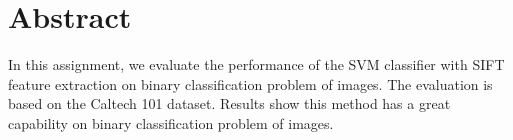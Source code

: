 \section{Abstract}
In this assignment, 
we evaluate the performance of the SVM classifier with SIFT feature extraction on binary classification problem of images. 
The evaluation is based on the Caltech 101 dataset. 
Results show this method has a great capability on binary classification problem of images.